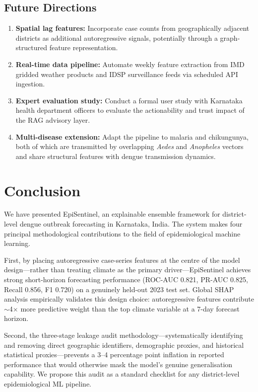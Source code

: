 \documentclass[conference]{IEEEtran}
\begin{document}
\subsection{Future Directions}

\begin{enumerate}
  \item \textbf{Spatial lag features:} Incorporate case counts from
    geographically adjacent districts as additional autoregressive
    signals, potentially through a graph-structured feature
    representation.
  \item \textbf{Real-time data pipeline:} Automate weekly feature
    extraction from IMD gridded weather products and IDSP
    surveillance feeds via scheduled API ingestion.
  \item \textbf{Expert evaluation study:} Conduct a formal user
    study with Karnataka health department officers to evaluate
    the actionability and trust impact of the RAG advisory layer.
  \item \textbf{Multi-disease extension:} Adapt the pipeline to
    malaria and chikungunya, both of which are transmitted by
    overlapping \textit{Aedes} and \textit{Anopheles} vectors and
    share structural features with dengue transmission dynamics.
\end{enumerate}

\section{Conclusion}
\label{sec:conclusion}

We have presented EpiSentinel, an explainable ensemble framework
for district-level dengue outbreak forecasting in Karnataka, India.
The system makes four principal methodological contributions to the
field of epidemiological machine learning.

First, by placing autoregressive case-series features at the centre
of the model design---rather than treating climate as the primary
driver---EpiSentinel achieves strong short-horizon forecasting
performance (ROC-AUC 0.821, PR-AUC 0.825, Recall 0.856, F1 0.720)
on a genuinely held-out 2023 test set. Global SHAP analysis
empirically validates this design choice: autoregressive features
contribute $\sim$4$\times$ more predictive weight than the top
climate variable at a 7-day forecast horizon.

Second, the three-stage leakage audit methodology---systematically
identifying and removing direct geographic identifiers, demographic
proxies, and historical statistical proxies---prevents a 3--4
percentage point inflation in reported performance that would
otherwise mask the model's genuine generalisation capability. We
propose this audit as a standard checklist for any district-level
epidemiological ML pipeline.
\end{document}
